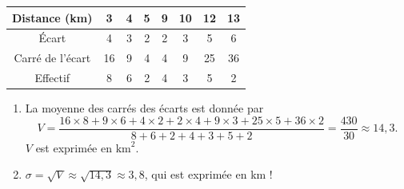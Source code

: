 {\begin{enumerate}
		\begin{center}
\def\arraystretch{1.5}
\setlength\tabcolsep{15pt}
		\begin{tabular}{|*{8}{c|}}\hline
			Distance (km) & 3 & 4 & 5 & 9 & 10 & 12 & 13
			\\\hline
			Écart & 4 & 3 & 2 & 2 & 3 & 5 & 6
			\\\hline
			Carré de l'écart & 16 & 9 & 4 & 4 & 9 & 25 & 36
			\\\hline
			Effectif & 8 & 6 & 2 & 4 & 3 & 5 & 2
			\\\hline
		\end{tabular}
		\end{center}
		\begin{enumerate}[start=3]
			\item
			La moyenne des carrés des écarts est donnée par
				\[ V = \frac{16\times8+9\times6+4\times2+2\times4+9\times3+25\times5+36\times2}{8+6+2+4+3+5+2} = \frac{430}{30} \approx 14,3. \]
			$V$ est exprimée en $\text{km}^2$.
			\item
			$\sigma = \sqrt{V} \approx \sqrt{14,3} \approx 3,8$, qui est exprimée en km !
		\end{enumerate}
	\end{enumerate}
}






